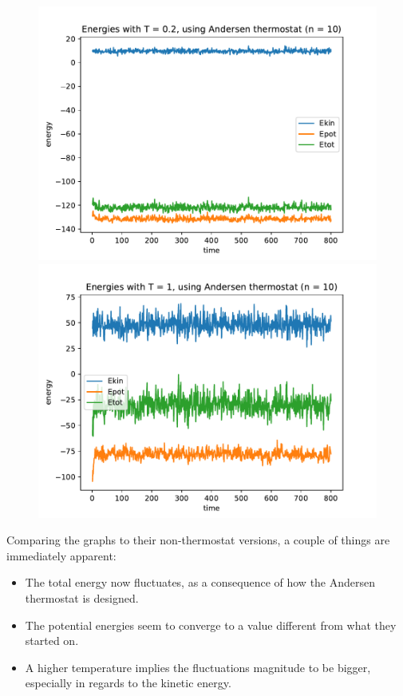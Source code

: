 \documentclass[a4paper,12pt]{article}
\begin{document}
\begin{figure}[!ht]
  \centering
  \begin{minipage}{0.49\textwidth}
    \includegraphics[width=\textwidth]{img/3_2c_T02_n10.pdf}
  \end{minipage}
  \begin{minipage}{0.49\textwidth}
    \includegraphics[width=\textwidth]{img/3_2c_T1_n10.pdf}
  \end{minipage}
\end{figure}

Comparing the graphs to their non-thermostat versions, a couple of things are immediately apparent:

\begin{itemize}
  \item The total energy now fluctuates, as a consequence of how the Andersen thermostat is designed.
  \item The potential energies seem to converge to a value different from what they started on.
  \item A higher temperature implies the fluctuations magnitude to be bigger, especially in regards to the kinetic
        energy.
\end{itemize}
\end{document}

